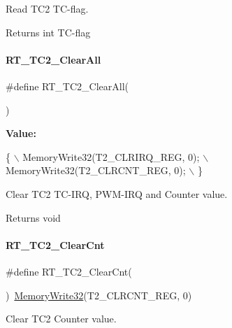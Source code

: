 Read T\+C2 T\+C-\/flag. 

\begin{DoxyReturn}{Returns}
int T\+C-\/flag 
\end{DoxyReturn}
\mbox{\label{a00047_a6b71644043f022558ee65f6197d0fe5d}} 
\paragraph{\texorpdfstring{R\+T\+\_\+\+T\+C2\+\_\+\+Clear\+All}{RT\_TC2\_ClearAll}}
{\footnotesize\ttfamily \#define R\+T\+\_\+\+T\+C2\+\_\+\+Clear\+All(\begin{DoxyParamCaption}{ }\end{DoxyParamCaption})}

{\bfseries Value\+:}
\begin{DoxyCode}
\{                                    \(\backslash\)
        MemoryWrite32(T2\_CLRIRQ\_REG, 0); \(\backslash\)
        MemoryWrite32(T2\_CLRCNT\_REG, 0); \(\backslash\)
    \}
\end{DoxyCode}


Clear T\+C2 T\+C-\/\+I\+RQ, P\+W\+M-\/\+I\+RQ and Counter value. 

\begin{DoxyReturn}{Returns}
void 
\end{DoxyReturn}
\mbox{\label{a00047_ab1818ddcd1db9a3582f3bc37e1d62881}} 
\paragraph{\texorpdfstring{R\+T\+\_\+\+T\+C2\+\_\+\+Clear\+Cnt}{RT\_TC2\_ClearCnt}}
{\footnotesize\ttfamily \#define R\+T\+\_\+\+T\+C2\+\_\+\+Clear\+Cnt(\begin{DoxyParamCaption}{ }\end{DoxyParamCaption})~\mbox{\hyperlink{a00020_ad9953f631a539cfaa35baf94f878b3ec}{Memory\+Write32}}(T2\+\_\+\+C\+L\+R\+C\+N\+T\+\_\+\+R\+EG, 0)}



Clear T\+C2 Counter value. 

